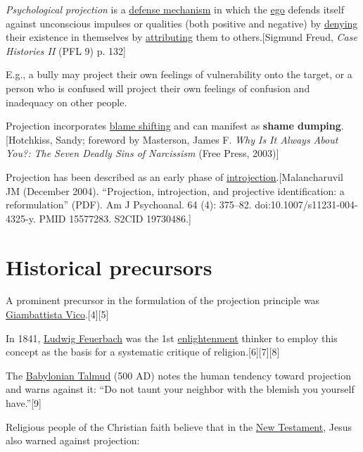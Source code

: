 \documentclass{book}
\numberwithin{equation}{section}
\begin{document}
\textit{Psychological projection} is a \href{https://en.wikipedia.org/wiki/Defense_mechanism}{defense mechanism} in which the \href{https://en.wikipedia.org/wiki/Ego_(Freudian)}{ego} defends itself against unconscious impulses or qualities (both positive and negative) by \href{https://en.wikipedia.org/wiki/Denial}{denying} their existence in themselves by \href{https://en.wikipedia.org/wiki/Attribution_(psychology)}{attributing} them to others.[Sigmund Freud, \textit{Case Histories II} (PFL 9) p. 132]

E.g., a bully may project their own feelings of vulnerability onto the target, or a person who is confused will project their own feelings of confusion and inadequacy on other people.

%
Projection incorporates \href{https://en.wikipedia.org/wiki/Blame_shifting}{blame shifting} and can manifest as \textbf{shame dumping}.[Hotchkiss, Sandy; foreword by Masterson, James F. \textit{Why Is It Always About You?: The Seven Deadly Sins of Narcissism} (Free Press, 2003)]

%
Projection has been described as an early phase of \href{https://en.wikipedia.org/wiki/Introjection}{introjection}.[Malancharuvil JM (December 2004). ``Projection, introjection, and projective identification: a reformulation'' (PDF). Am J Psychoanal. 64 (4): 375--82. doi:10.1007/s11231-004-4325-y. PMID 15577283. S2CID 19730486.]

\section{Historical precursors}
A prominent precursor in the formulation of the projection principle was \href{https://en.wikipedia.org/wiki/Giambattista_Vico}{Giambattista Vico}.[4][5]

In 1841, \href{https://en.wikipedia.org/wiki/Ludwig_Feuerbach}{Ludwig Feuerbach} was the 1st \href{https://en.wikipedia.org/wiki/Age_of_Enlightenment}{enlightenment} thinker to employ this concept as the basis for a systematic critique of religion.[6][7][8]

%
The \href{https://en.wikipedia.org/wiki/Babylonian_Talmud}{Babylonian Talmud} (500 AD) notes the human tendency toward projection and warns against it: ``Do not taunt your neighbor with the blemish you yourself have.''[9]

Religious people of the Christian faith believe that in the \href{https://en.wikipedia.org/wiki/New_Testament}{New Testament}, Jesus also warned against projection:
\end{document}
